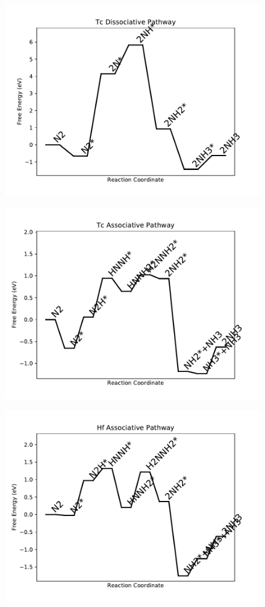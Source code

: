 \begin{figure}
\includegraphics[width=0.8\linewidth]{data/plots/Tc_dissociative.pdf}
\label{fig:Tc_dissociative}
\end{figure}

\begin{figure}
\includegraphics[width=0.8\linewidth]{data/plots/Tc_associative.pdf}
\label{fig:Tc_associative}
\end{figure}

\begin{figure}
\includegraphics[width=0.8\linewidth]{data/plots/Hf_associative.pdf}
\label{fig:Hf_associative}
\end{figure}

